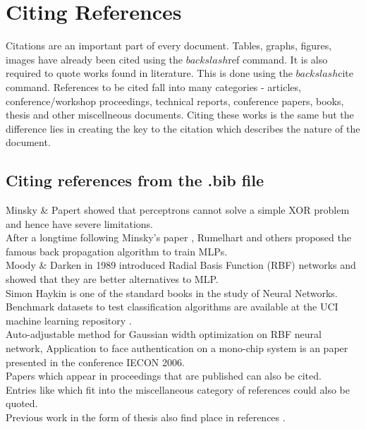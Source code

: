 \chapter{Citing References}
\graphicspath{{Chapter5/Chapter5Figs/EPS/}{Chapter5/Chapter5Figs/}}

%
Citations are an important part of every document. Tables, graphs, figures, images have already been cited using the $backslash$ref command. It is also required to quote works found in literature. This is done using the $backslash$cite command. References to be cited fall into many categories - articles, conference/workshop proceedings, technical reports, conference papers, books, thesis and other miscellneous documents. Citing these works is the same but the difference lies in creating the key to the citation which describes the nature of the document. 

\section{Citing references from the .bib file}

Minsky \& Papert \cite{Minsky-Papert:Neuron} showed that perceptrons cannot solve a simple XOR problem and hence have severe limitations. \\

After a longtime following Minsky's paper \cite{Minsky-Papert:Neuron}, Rumelhart and others \cite{Rumelhart-Hinton-Williams:MLP} proposed the famous back propagation algorithm to train MLPs. \\ 

Moody \& Darken \cite{Moody-Darken:RBF} in 1989 introduced Radial Basis Function (RBF) networks and showed that they are better alternatives to MLP. \\

Simon Haykin \cite{Haykin:NN} is one of the standard books in the study of Neural Networks. \\

Benchmark datasets to test classification algorithms are available at the UCI machine learning repository \cite{UCI:Database}.  \\

Auto-adjustable method for Gaussian width optimization on RBF neural network, Application to face authentication on a mono-chip system \cite{Lionel-Jacques-Cecile:RBF} is an paper presented in the conference IECON 2006.  \\

Papers \cite{Slade-Gedeon:AL} which appear in proceedings that are published can also be cited.  \\

Entries like \cite{Orr:RBF} which fit into the miscellaneous category of references could also be quoted. \\

Previous work in the form of thesis also find place in references \cite{Simon:LA}.  \\


